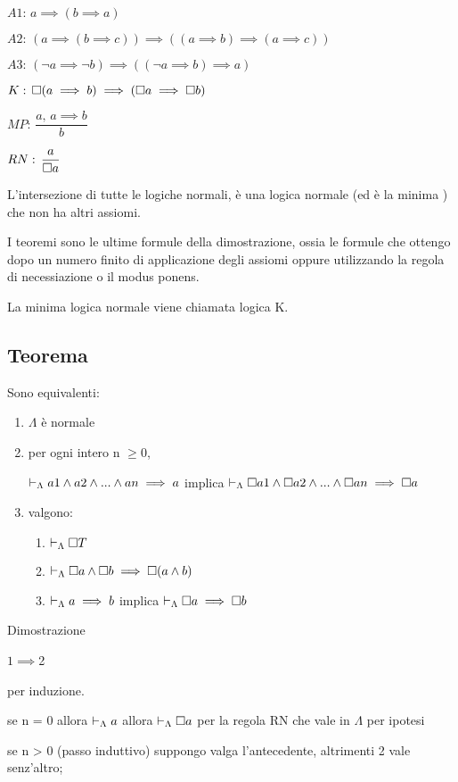 $A1:\, a\implies(b\implies a)$

$A2:\,(a\implies(b\implies c))\implies((a\implies b)\implies(a\implies c))$

$A3:\,(\neg a\implies\neg b)\implies((\neg a\implies b)\implies a)$

$K:\,\square(a\implies b)\implies(\square a\implies\square b)$

$MP:\,\dfrac{a,\, a\implies b}{b}$

$RN:\,\dfrac{a}{\square a}$

L'intersezione di tutte le logiche normali, è una logica normale (ed
è la minima ) che non ha altri assiomi.

I teoremi sono le ultime formule della dimostrazione, ossia le formule
che ottengo dopo un numero finito di applicazione degli assiomi oppure
utilizzando la regola di necessiazione o il modus ponens.

La minima logica normale viene chiamata logica K.


\subsection{Teorema}

Sono equivalenti: 
\begin{enumerate}
\item $\Lambda$ è normale 
\item per ogni intero n $\geq0$,


$\vdash_{\Lambda}a1\wedge a2\wedge...\wedge an\implies a$ implica $\vdash_{\Lambda}\square a1\wedge\square a2\wedge...\wedge\square a n\implies\square a$

\item valgono:

\begin{enumerate}
\item $\vdash_{\Lambda}\square T$ 
\item $\vdash_{\Lambda}\square a\wedge\square b\implies\square(a\wedge b)$ 
\item $\vdash_{\Lambda}a\implies b$ implica $\vdash_{\Lambda}\square a\implies\square b$ 
\end{enumerate}
\end{enumerate}
Dimostrazione

$1\implies$2

per induzione.

se n = 0 allora $\vdash_{\Lambda}a$ allora $\vdash_{\Lambda}\square a$ per la regola
RN che vale in $\Lambda$ per ipotesi

se n > 0 (passo induttivo) suppongo valga l'antecedente, altrimenti
2 vale senz'altro;

